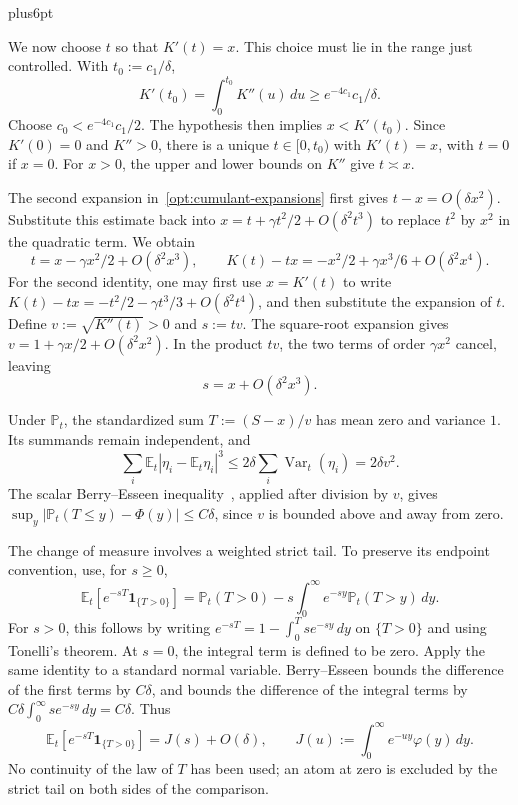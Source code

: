 \documentclass[11pt,letterpaper,twoside,leqno]{article}
\makeatletter
\theoremstyle{bookplain}
\theoremstyle{bookremark}
\renewenvironment{proof}[1][\proofname]{\par
  \pushQED{\qed}\normalfont\topsep6pt plus6pt\relax
  \trivlist\item[\hskip\labelsep\bfseries #1\@addpunct{.}]\ignorespaces
}{\popQED\endtrivlist\@endpefalse}
\newcommand{\E}{\mathbb E}
\newcommand{\Pp}{\mathbb P}
\newcommand{\Var}{\operatorname{Var}}
\newcommand{\ind}{\mathbf 1}
\makeatother
\begin{document}
\begin{proof}
We now choose $t$ so that $K'(t)=x$. This choice must lie in
the range just controlled. With $t_0:=c_1/\delta$,
\[
 K'(t_0)=\int_0^{t_0}K''(u)\,du
 \ge e^{-4c_1}c_1/\delta.
\]
Choose $c_0<e^{-4c_1}c_1/2$. The hypothesis then implies
$x<K'(t_0)$. Since $K'(0)=0$ and $K''>0$, there is a
unique $t\in[0,t_0)$ with $K'(t)=x$, with $t=0$ if $x=0$.
For $x>0$, the upper and lower bounds on $K''$ give
$t\asymp x$.

The second expansion in~\eqref{opt:cumulant-expansions} first
gives $t-x=O(\delta x^2)$. Substitute this estimate back into
$x=t+\gamma t^2/2+O(\delta^2t^3)$ to replace $t^2$ by $x^2$
in the quadratic term. We obtain
\begin{equation}
 t=x-\gamma x^2/2+O(\delta^2x^3),\qquad
 K(t)-tx=-x^2/2+\gamma x^3/6+O(\delta^2x^4).
 \label{opt:tilt-root}
\end{equation}
For the second identity, one may first use $x=K'(t)$ to write
$K(t)-tx=-t^2/2-\gamma t^3/3+O(\delta^2t^4)$, and then
substitute the expansion of $t$.
Define $v:=\sqrt{K''(t)}>0$ and $s:=tv$. The square-root
expansion gives $v=1+\gamma x/2+O(\delta^2x^2)$.
In the product $tv$, the two terms of order $\gamma x^2$
cancel, leaving
\begin{equation}
 s=x+O(\delta^2x^3).
 \label{opt:tilted-scale}
\end{equation}

Under $\Pp_t$, the standardized sum $T:=(S-x)/v$ has mean
zero and variance $1$. Its summands remain independent, and
\[
 \sum_i\E_t|\eta_i-\E_t\eta_i|^3
 \le2\delta\sum_i\Var_t(\eta_i)=2\delta v^2.
\]
The scalar Berry--Esseen inequality~\cite{Berry1941}, applied
after division by $v$, gives
$\sup_y|\Pp_t(T\le y)-\Phi(y)|\le C\delta$, since $v$
is bounded above and away from zero.

The change of measure involves a weighted strict tail. To preserve
its endpoint convention, use, for $s\ge0$,
\[
 \E_t[e^{-sT}\ind_{\{T>0\}}]
 =\Pp_t(T>0)-s\int_0^\infty e^{-sy}\Pp_t(T>y)\,dy.
\]
For $s>0$, this follows by writing
$e^{-sT}=1-\int_0^T se^{-sy}\,dy$ on $\{T>0\}$ and using
Tonelli's theorem. At $s=0$, the integral term is defined to be
zero. Apply the same identity to a standard normal variable.
Berry--Esseen bounds the difference of the first terms by
$C\delta$, and bounds the difference of the integral terms by
$C\delta\int_0^\infty se^{-sy}\,dy=C\delta$. Thus
\begin{equation}
 \E_t[e^{-sT}\ind_{\{T>0\}}]=J(s)+O(\delta),\qquad
 J(u):=\int_0^\infty e^{-uy}\varphi(y)\,dy.
 \label{opt:strict-tail}
\end{equation}
No continuity of the law of $T$ has been used; an atom at zero
is excluded by the strict tail on both sides of the comparison.


\end{proof}
\end{document}
